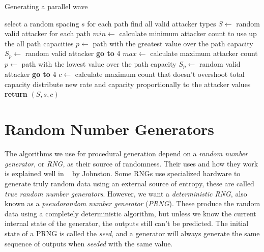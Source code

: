 \begin{algorithm}[H]
    \caption{Generating a parallel wave}
    \label{alg:wave-parallel}
    \begin{algorithmic}[1]
        \State select a random spacing $s$
        \State for each path find all valid attacker types
        \State $S \gets$ random valid attacker for each path
        \Statex
        \State $min \gets$ calculate minimum attacker count to use up the all path capacities
        \State $p \gets$ path with the greatest value over the path capacity
        \State $S_p \gets$ random valid attacker
        \State \textbf{go to} 4 
        \EndIf
        \Statex
        \State $max \gets$ calculate maximum attacker count
        \State $p \gets$ path with the lowest value over the path capacity
        \State $S_p \gets$ random valid attacker
        \State \textbf{go to} 4 
        \EndIf
        \Statex
        \State $c \gets$ calculate maximum count that doesn't overshoot total capacity
        \State distribute new rate and capacity proportionally to the attacker values
        \State \textbf{return} $(S, s, c)$
        \Statex
    \end{algorithmic}
\end{algorithm}
\section{Random Number Generators}\label{sec:analysis-rng}

The algorithms we use for procedural generation depend on a \emph{random number generator}, or \emph{RNG}, as their source of randomness.
Their uses and how they work is explained well in ~\cite{johnston2018random} by Johnston.
Some RNGs use specialized hardware to generate truly random data using an external source of entropy, these are called \emph{true random number generators}.
However, we want a \emph{deterministic RNG}, also known as a \emph{pseudorandom number generator} (\emph{PRNG}).
These produce the random data using a completely deterministic algorithm, but unless we know the current internal state of the generator, the outputs still can't be predicted.
The initial state of a PRNG is called the \emph{seed}, and a generator will always generate the same sequence of outputs when \emph{seeded} with the same value.

